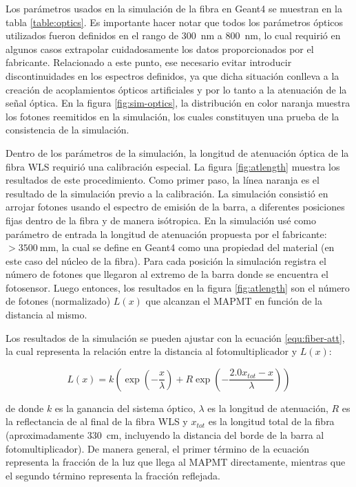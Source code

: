 Los parámetros usados en la simulación de la fibra en Geant4 se muestran en la tabla \ref{table:optics}. Es importante hacer notar que todos los parámetros ópticos utilizados fueron definidos en el rango de \SI{300}{\nano\metre} a \SI{800}{\nano\metre}, lo cual requirió en algunos casos extrapolar cuidadosamente los datos proporcionados por el fabricante. Relacionado a este punto, ese necesario evitar introducir discontinuidades en los espectros definidos, ya que dicha situación conlleva a la creación de acoplamientos ópticos artificiales y por lo tanto a la atenuación de la señal óptica. En la figura \ref{fig:sim-optics}, la distribución en color naranja muestra los fotones reemitidos en la simulación, los cuales constituyen una prueba de la consistencia de la simulación.

Dentro de los parámetros de la simulación, la longitud de atenuación óptica de la fibra WLS requirió una calibración especial. La figura \ref{fig:atlength} muestra los resultados de este procedimiento. Como primer paso, la línea naranja es el resultado de la simulación previo a la calibración. La simulación consistió en arrojar fotones usando el espectro de emisión de la barra, a diferentes posiciones fijas dentro de la fibra y de manera isótropica. En la simulación usé como parámetro de entrada la longitud de atenuación propuesta por el fabricante: $>\SI{3500}{\milli\metre}$, la cual se define en Geant4 como una propiedad del material (en este caso del núcleo de la fibra). Para cada posición la simulación registra el número de fotones que llegaron al extremo de la barra donde se encuentra el fotosensor. Luego entonces, los resultados en la figura \ref{fig:atlength} son el número de fotones (normalizado) $L(x)$ que alcanzan el MAPMT en función de la distancia al mismo.

Los resultados de la simulación se pueden ajustar con la ecuación \ref{equ:fiber-att}, la cual representa la relación entre la distancia al fotomultiplicador y $L(x)$:

\begin{equation}
\label{equ:fiber-att}
L(x)=k\left(\exp\left(-\frac{x}{\lambda}\right) +R\exp\left(-\frac{2.0x_{tot}-x}{\lambda}\right)\right)
\end{equation}

de donde $k$ es la ganancia del sistema óptico, $\lambda$ es la longitud de atenuación, $R$ es la reflectancia de al final de la fibra WLS y $x_{tot}$ es la longitud total de la fibra (aproximadamente \SI{330}{\cm}, incluyendo la distancia del borde de la barra al fotomultiplicador). De manera general, el primer término de la ecuación representa la fracción de la luz que llega al MAPMT directamente, mientras que el segundo término representa la fracción reflejada.

